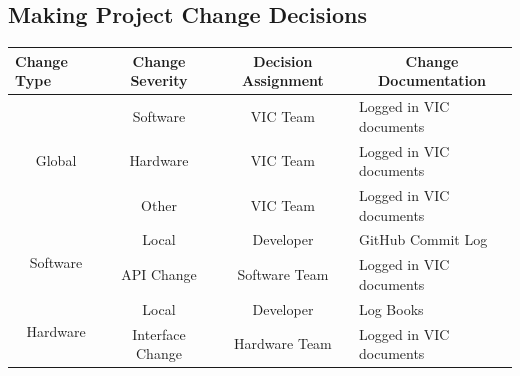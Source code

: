 \documentclass [12pt]{article}
\begin{document}
\subsection{Making Project Change Decisions} 
\begin{longtable}{| p{ } | p{ } | p{ } | p{ } |}
\hline
\centering \textbf{Change Type} & 
\multicolumn{1}{c|}{\textbf {Change Severity}} &
\multicolumn{1}{c}{\textbf {Decision Assignment}} & 
\multicolumn{1}{|c|}{\textbf {Change Documentation}}  \\ \hline

\multicolumn{1}{|c|}{\multirow{3}{*}{Global}} & 
\multicolumn{1}{c}{Software} &
\multicolumn{1}{|c|}{VIC Team} &
Logged in VIC documents	\\\cline{2-4}

 & \multicolumn{1}{c}{Hardware} & 
 \multicolumn{1}{|c|}{VIC Team} &
Logged in VIC documents\\ \cline{2-4}
  
   & \multicolumn{1}{c}{Other} & 
 \multicolumn{1}{|c|}{VIC Team} &
Logged in VIC documents\\ \hline
 
 
\multicolumn{1}{|c|}{\multirow{2}{*}{Software}} & 
\multicolumn{1}{c}{Local} &
\multicolumn{1}{|c|}{Developer}&
GitHub Commit Log \\\cline{2-4}
 
 & 
\multicolumn{1}{c}{API Change} &
\multicolumn{1}{|c|}{Software Team}&
Logged in VIC documents \\ \hline


\multicolumn{1}{|c|}{\multirow{2}{*}{Hardware}} & 
\multicolumn{1}{c}{Local} &
\multicolumn{1}{|c|}{Developer}&
Log Books \\\cline{2-4}
 
 & 
\multicolumn{1}{c}{Interface Change} &
\multicolumn{1}{|c|}{Hardware Team}&
Logged in VIC documents \\ \hline


\end{longtable}

\end{document}
